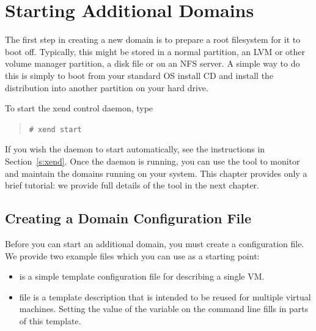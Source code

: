 \documentclass[11pt,twoside,final,openright]{report}
\def\xend{{xend}\xspace}
\begin{document}
\chapter{Starting Additional Domains}

The first step in creating a new domain is to prepare a root
filesystem for it to boot off.  Typically, this might be stored in a
normal partition, an LVM or other volume manager partition, a disk
file or on an NFS server.  A simple way to do this is simply to boot
from your standard OS install CD and install the distribution into
another partition on your hard drive.

To start the \xend control daemon, type
\begin{quote}
\verb!# xend start!
\end{quote}
If you
wish the daemon to start automatically, see the instructions in
Section~\ref{s:xend}. Once the daemon is running, you can use the
 tool to monitor and maintain the domains running on your
system. This chapter provides only a brief tutorial: we provide full
details of the  tool in the next chapter. 

%
%
%


\section{Creating a Domain Configuration File} 

Before you can start an additional domain, you must create a
configuration file. We provide two example files which you 
can use as a starting point: 
\begin{itemize} 
  \item {} is a simple template configuration file
    for describing a single VM.

  \item {} file is a template description that
    is intended to be reused for multiple virtual machines.  Setting
    the value of the  variable on the  command line
    fills in parts of this template.
\end{itemize} 
\end{document}
